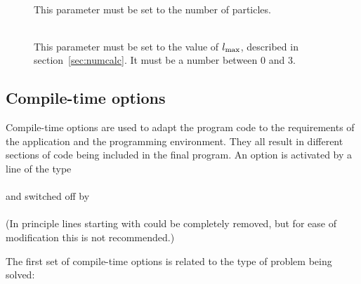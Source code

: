 \begin{description}

\item[]
\\
This parameter must be set to the number of particles.

\item[]
\\
This parameter must be set to the value of $l_{\rm max}$, described in
section~\ref{sec:numcalc}. It must be a number between 0 and 3.

\end{description}


\subsection{Compile-time options}

Compile-time options are used to adapt the program code to the
requirements of the application and the programming environment. They
all result in different sections of code being included in the final
program. An option is activated by a line of the type\\
\wsp{}\\
and switched off by\\
\wsp{}\\
(In principle lines starting with  could be completely
removed, but for ease of modification this is not recommended.)

The first set of compile-time options is related to the type of
problem being solved:

